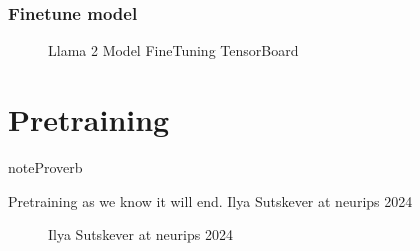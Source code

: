 \documentclass[letterpaper,11pt,english]{sphinxmanual}
\begin{document}
\subsection{Fine\sphinxhyphen{}tune model}
\label{\detokenize{finetuning:fine-tune-model}}
\begin{sphinxVerbatim}[commandchars=\\\{\}]
  


\end{sphinxVerbatim}

\begin{figure}[htbp]
\centering
\capstart

\noindent{}
\caption{Llama 2 Model Fine\sphinxhyphen{}Tuning TensorBoard}\label{\detokenize{finetuning:id7}}\label{\detokenize{finetuning:fig-fine-tuning-llm}}\end{figure}

\sphinxstepscope


\chapter{Pre\sphinxhyphen{}training}
\label{\detokenize{pretraining:pre-training}}\label{\detokenize{pretraining:pretraining}}\label{\detokenize{pretraining::doc}}
\begin{sphinxadmonition}{note}{Proverb}

\sphinxAtStartPar
Pre\sphinxhyphen{}training as we know it will end. \textendash{} Ilya Sutskever at neurips 2024

\begin{figure}[H]
\centering
\capstart

\noindent{}
\caption{Ilya Sutskever at neurips 2024}\label{\detokenize{pretraining:id8}}\label{\detokenize{pretraining:fig-ilya}}\end{figure}
\end{sphinxadmonition}
\end{document}
